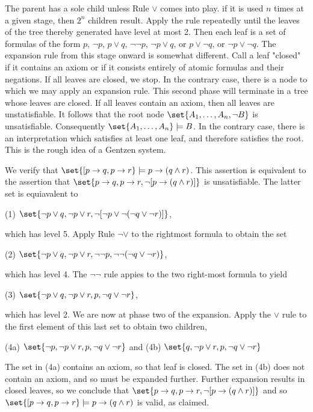 The parent has a sole child unless Rule $\lor$ comes into play.  if it is used $n$ times at a given stage, then $2^n$ children result.  Apply the rule repeatedly until the leaves of the tree thereby generated have level at most 2.  Then each leaf is a set of formulas of the form $p$, $\neg p$, $p \lor q$, $\neg \neg p$, $\neg p \lor q$, or $p \lor \neg q$, or $\neg p \lor \neg q$. The expansion rule from this stage onward is somewhat different.  Call a leaf "closed" if it contains an axiom or if it consists entirely of atomic formulas and their negations.  If all leaves are closed, we stop.  In the contrary case, there is a node to which we may apply an expansion rule.  This 
second phase will terminate in a tree whose leaves are closed.  If all leaves contain an axiom, then all leaves are unstatisfiable.  It follows that the root node $\set{A_1, \ldots, A_n, \neg B}$ is unsatisfiable.  Consequently $\set{A_1, \ldots, A_n} \models B$.   In the contrary case, there is an interpretation which satisfies at least one leaf, and therefore satisfies the root.  This is the rough idea of a Gentzen system.




We verify that $\set{ [ p \to q, p \to r} \models p \to (q \land r)$.  This assertion is equivalent to the assertion that $\set{p \to q, p \to r, \neg[ p \to (q \land r)] } $ is unsatisfiable.  The latter set is equiavalent to 

\begin{indent}
(1) 
$ \set{ \neg p \lor q, \neg p \lor r, \neg[\neg p \lor \neg(\neg q \lor \neg r)] }$, 
\end{indent}

which has level 5.  Apply Rule $\neg \lor$ to the rightmost formula to obtain the set

\begin{indent}
(2) 
$ \set{ \neg p \lor q, \neg p \lor r, \neg\neg p, \neg\neg(\neg q \lor \neg r) }$,
\end{indent}

which has level 4.  The $\neg\neg$ rule appies to the two right-most formula to yield

\begin{indent}
(3) 
$ \set{ \neg p \lor q, \neg p \lor r,  p, \neg q \lor \neg r }$,
\end{indent}

which has level 2.  We are now at phase two of the expansion.  Apply the $\lor $ rule to the first element of this last set to obtain two children,

\begin{indent}
(4a) $\set{ \neg p, \neg p \lor r,  p, \neg q \lor \neg r }$  and (4b)   $\set{ q, \neg p \lor r,  p, \neg q \lor \neg r }$ 
\end{indent}

The set in (4a) contains an axiom, so that leaf is closed.  The set in (4b) does not contain an axiom, and so must be expanded further.  Further expansion results in closed leaves, so we conclude that $\set{p \to q, p \to r, \neg[ p \to (q \land r)] } $ and so $\set{ [ p \to q, p \to r} \models p \to (q \land r)$ is valid, as claimed.
  


